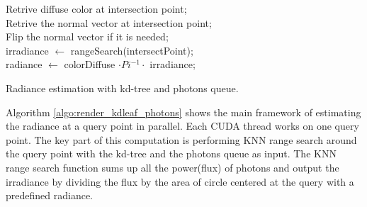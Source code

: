 \begin{algorithm}
	\SetAlgoLined
	
	 {
		Retrive diffuse color at intersection point; \\
		Retrive the normal vector at intersection point; \\
		Flip the normal vector if it is needed; \\
		irradiance \(\leftarrow\) rangeSearch(intersectPoint); \\
		radiance \(\leftarrow\) colorDiffuse \( \cdot Pi^{-1} \cdot\) irradiance; \\ 	
	}
	\caption{Radiance estimation with kd-tree and photons queue.} 	
	\label{algo:render_kdleaf_photons}
\end{algorithm}

Algorithm \ref{algo:render_kdleaf_photons} shows the main framework of estimating the radiance at a query point in parallel. Each CUDA thread works on one query point. The key part of this computation is performing KNN range search around the query point with the kd-tree and the photons queue as input. The KNN range search function sums up all the power(flux) of photons and output the irradiance by dividing the flux by the area of circle centered at the query with a predefined radiance.

